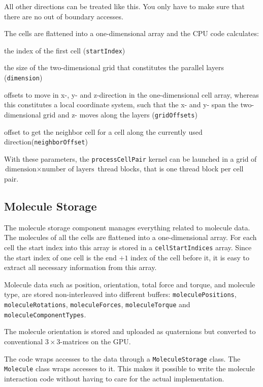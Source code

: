 All other directions can be treated like this. You only have to make sure that there are no out of boundary accesses.

The cells are flattened into a one-dimensional array and the CPU code calculates:
\begin{compactitem}
\item the index of the first cell (\lstinline!startIndex!)
\item the size of the two-dimensional grid that constitutes the parallel layers (\lstinline!dimension!)
\item offsets to move in x-, y- and z-direction in the one-dimensional cell array, whereas this constitutes a local coordinate system, such that the x- and y- span the two-dimensional grid and z- moves along the layers (\lstinline!gridOffsets!)
\item offset to get the neighbor cell for a cell along the currently used direction(\lstinline!neighborOffset!)
\end{compactitem}
With these parameters, the \lstinline!processCellPair! kernel can be launched in a grid of $ \text{dimension} \times \text{number of layers} $ thread blocks, that is one thread block per cell pair.

\subsection{Molecule Storage}
The molecule storage component manages everything related to molecule data. The molecules of all the cells are flattened into a one-dimensional array. For each cell the start index into this array is stored in a \lstinline!cellStartIndices! array. Since the start index of one cell is the end $ + 1 $ index of the cell before it, it is easy to extract all necessary information from this array.

Molecule data such as position, orientation, total force and torque, and molecule type, are stored non-interleaved into different buffers: \lstinline!moleculePositions!, \lstinline!moleculeRotations!, \lstinline!moleculeForces!, \lstinline!moleculeTorque! and \lstinline!moleculeComponentTypes!.

The molecule orientation is stored and uploaded as quaternions but converted to conventional $ 3 \times 3 $-matrices on the GPU.

The \cuda{} code wraps accesses to the data through a \lstinline!MoleculeStorage! class. The \lstinline!Molecule! class wraps accesses to it. This makes it possible to write the molecule interaction code without having to care for the actual implementation.

